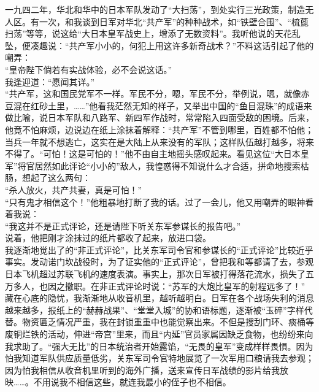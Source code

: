 一九四二年，华北和华中的日本军队发动了“大扫荡”，到处实行三光政策，制造无人区。有一次，和我谈到日军对华北“共产军”的种种战术，如“铁壁合围”、“梳蓖扫荡”等等，说这给“大日本皇军战史上，增添了无数资料”。我听他说的天花乱坠，便凑趣说：“共产军小小的，何犯上用这许多新奇战术？”不料这话引起了他的嘲弄：\\

“皇帝陛下倘若有实战体验，必不会说这话。”\\

我逢迎道：“愿闻其详。”\\

“共产军，这和国民党军不一样。军民不分，嗯，军民不分，举例说，嗯，就像赤豆混在红砂土里，……”他看我茫然无知的样子，又举出中国的“鱼目混珠”的成语来做比喻，说日本军队和八路军、新四军作战时，常常陷入四面受敌的困境。后来，他竟不怕麻烦，边说边在纸上涂抹着解释：“共产军”不管到哪里，百姓都不怕他；当兵一年就不想逃亡，这实在是大陆上从来没有的军队；这样队伍越打越多，将来不得了。“可怕！这是可怕的！”他不由自主地摇头感叹起来。看见这位“大日本皇军”将官居然如此评论“小小的”敌人，我惶惑得不知说什么才合适，拼命地搜索枯肠，想起了这么两句：\\

“杀人放火，共产共妻，真是可怕！”\\

“只有鬼才相信这个！”他粗暴地打断了我的话。过了一会儿，他又用嘲弄的眼神看着我说：\\

“我这并不是正式评论，还是请陛下听关东军参谋长的报告吧。”\\

说着，他把刚才涂抹过的纸片都收了起来，放进口袋。\\

我逐渐地觉出了的“非正式评论”，比关东军司令官和参谋长的“正式评论”比较近乎事实。发动诺门坎战役时，为了证实他的“正式评论”，曾把我和等都请了去，参观日本飞机超过苏联飞机的速度表演。事实上，那次日军被打得落花流水，损失了五万多人，也因之撤职。在非正式评论时说：“苏军的大炮比皇军的射程远多了！”\\

藏在心底的隐忧，我渐渐地从收音机里，越听越明白。日军在各个战场失利的消息越来越多，报纸上的“赫赫战果”、“堂堂入城”的协和语标题，逐渐被“玉碎”字样代替。物资匾乏情况严重，我在封锁重重中也能觉察出来。不但是搜刮门环、痰桶等废铜烂铁的活动，伸进“帝宫”里来，而且“内延”官员家属因缺乏食物，也纷纷来向我求助了。“强大无比”的日本统治者开始露馅，“无畏的皇军”变成样样畏惧。因为怕我知道军队供应质量低劣，关东军司令官特地展览了一次军用口粮请我去参观；因为怕我相信从收音机里听到的海外广播，送来宣传日军战绩的影片给我放映……。不用说我不相信这些，就连我最小的侄子也不相信。\\

